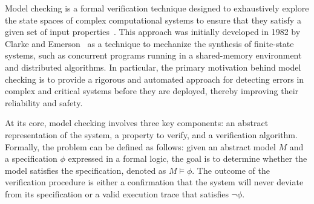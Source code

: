 Model checking is a formal verification technique designed to exhaustively explore the state spaces of complex computational systems to ensure that they satisfy a given set of input properties~\cite{stateexplosion}. This approach was initially developed in 1982 by Clarke and Emerson~\cite{modelchecking} as a technique to mechanize the synthesis of finite-state systems, such as concurrent programs running in a shared-memory environment and distributed algorithms. In particular, the primary motivation behind model checking is to provide a rigorous and automated approach for detecting errors in complex and critical systems before they are deployed, thereby improving their reliability and safety. 

At its core, model checking involves three key components: an abstract representation of the system, a property to verify, and a verification algorithm. Formally, the problem can be defined as follows: given an abstract model $M$ and a specification $\phi$ expressed in a formal logic, the goal is to determine whether the model satisfies the specification, denoted as $M \models \phi$. The outcome of the verification procedure is either a confirmation that the system will never deviate from its specification or a valid execution trace that satisfies $\neg \phi$.

